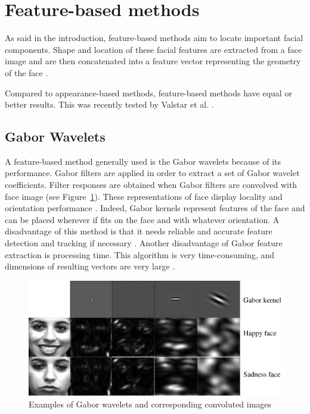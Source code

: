 \section{Feature-based methods}

\noindent As said in the introduction, feature-based methods aim to locate important facial components. Shape and location of these facial features are extracted from a face image and are then concatenated into a feature vector representing the geometry of the face \cite{SHA09}.
\newline

\noindent Compared to appearance-based methods, feature-based methods have equal or better results. This was recently tested by Valstar et al. \cite{VAL05} \cite{VAL06}.
\newline

\subsection{Gabor Wavelets}

\vspace{\baselineskip}
\noindent A feature-based method generally used is the Gabor wavelets because of its performance. Gabor filters are applied in order to extract a set of Gabor wavelet coefficients. Filter responses are obtained when Gabor filters are convolved with face image (see Figure~\ref{gabor_wavelets_example}). These representations of face display locality and orientation performance \cite{JEM09}. Indeed, Gabor kernels represent features of the face and can be placed wherever if fits on the face and with whatever orientation. A disadvantage of this method is that it needs reliable and accurate feature detection and tracking if necessary \cite{SHA09}. Another disadvantage of Gabor feature extraction is processing time. This algorithm is very time-consuming, and dimensions of resulting vectors are very large \cite{PRA09}.
\newline

\begin{figure}[!h]
\begin{center}
\noindent \includegraphics[scale=0.8]{figures/gabor_wavelets_example} 
\newline
\caption{Examples of Gabor wavelets and corresponding convoluted images}
\label{gabor_wavelets_example}
\end{center} 
\end{figure}

